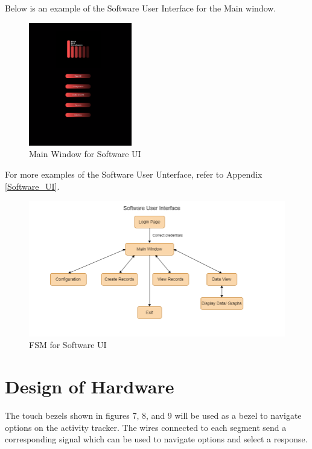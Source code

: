 \documentclass[12pt, titlepage]{article}
\begin{document}
Below is an example of the Software User Interface for the Main window.
\begin{figure}[H]
	\begin{center}
		 \includegraphics[width=0.4\textwidth]{MainWindow}
		\caption{Main Window for Software UI}
		\label{MainWindow} 
	\end{center}
\end{figure}

For more examples of the Software User Unterface, refer to Appendix \ref{Software_UI}.

\begin{figure}[H]
	\begin{center}
		 \includegraphics[width=1\textwidth]{SoftwareUI_FSM}
		\caption{FSM for Software UI}
		\label{SoftwareUI_FSM} 
	\end{center}
\end{figure}

\section{Design of Hardware}

The touch bezels shown in figures 7, 8, and 9 will be used as a bezel to navigate options on the activity tracker. The wires connected to each segment send a corresponding signal which can be used to navigate options and select a response.
\end{document}
